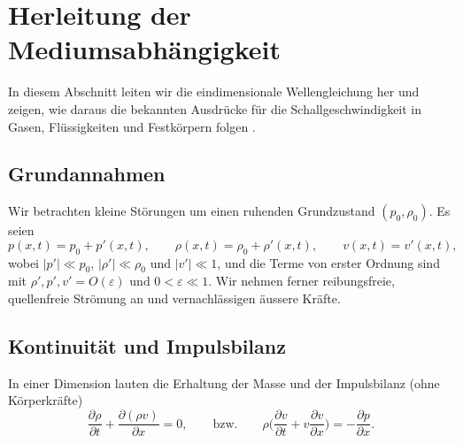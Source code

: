 %

%
%
%
\section{Herleitung der Mediumsabhängigkeit
\label{schall:section:teil1}}

In diesem Abschnitt leiten wir die eindimensionale Wellengleichung her
und zeigen, wie daraus die bekannten Ausdrücke für die Schallgeschwindigkeit
in Gasen, Flüssigkeiten und Festkörpern folgen
\cite{schall:kinsler,schall:landaulifschitz}.

\subsection{Grundannahmen}
Wir betrachten kleine Störungen um einen ruhenden Grundzustand $(p_0,\rho_0)$.
Es seien
\[
    p(x,t)=p_0+p'(x,t),\qquad \rho(x,t)=\rho_0+\rho'(x,t),\qquad v(x,t)=v'(x,t),
\]
wobei $|p'|\ll p_0$, $|\rho'|\ll \rho_0$ und $|v'|\ll 1$,
und die Terme von erster Ordnung sind mit
$\rho',p',v' = O(\varepsilon) \text{ und } 0<\varepsilon\ll 1$.
Wir nehmen ferner reibungsfreie, quellenfreie Strömung an und
vernachlässigen äussere Kräfte.


\subsection{Kontinuität und Impulsbilanz}
%
In einer Dimension lauten die Erhaltung der Masse und der Impulsbilanz
(ohne Körperkräfte)
\begin{equation}
\frac{\partial \rho}{\partial t}+\frac{\partial(\rho v)}{\partial x}=0,
\qquad\text{bzw.}\qquad
\rho\biggl(\frac{\partial v}{\partial t}+v\frac{\partial v}{\partial x}\biggr)=-\frac{\partial p}{\partial x}.
\label{eq:exact-cont-mom}
\end{equation}

